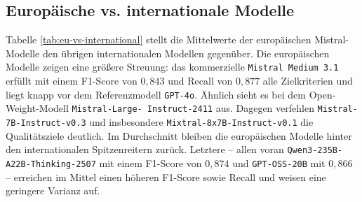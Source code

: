 \subsection*{Europäische vs. internationale Modelle}

Tabelle \ref{tab:eu-vs-international} stellt die Mittelwerte der europäischen Mistral-Modelle den übrigen internationalen Modellen gegenüber. Die europäischen Modelle zeigen eine größere Streuung: das kommerzielle \texttt{Mistral Medium 3.1} erfüllt mit einem F1-Score von $0{,}843$ und Recall von $0{,}877$ alle Zielkriterien und liegt knapp vor dem Referenzmodell \texttt{GPT-4o}. Ähnlich sieht es bei dem Open-Weight-Modell \texttt{Mistral-Large-\linebreak~Instruct-2411} aus. Dagegen verfehlen \texttt{Mistral-7B-Instruct-v0.3} und insbesondere \texttt{Mixtral-8x7B-Instruct-v0.1} die Qualitätsziele deutlich. Im Durchschnitt bleiben die europäischen Modelle hinter den internationalen Spitzenreitern zurück. Letztere – allen voran \texttt{Qwen3-235B-A22B-Thinking-2507} mit einem F1-Score von $0{,}874$ und \texttt{GPT-OSS-20B} mit $0{,}866$ – erreichen im Mittel einen höheren F1-Score sowie Recall und weisen eine geringere Varianz auf.

